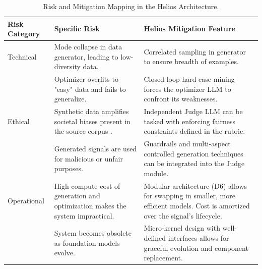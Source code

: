 \documentclass{article}
\begin{document}
\begin{table}[h]
  \centering
  \caption{Risk and Mitigation Mapping in the Helios Architecture.}
  \label{tab:risk_mitigation}
  \begin{tabular}{p{2.5cm}p{4.5cm}p{5cm}}
    \toprule
    \textbf{Risk Category} & \textbf{Specific Risk}                                                                                            & \textbf{Helios Mitigation Feature}                                                                                                                      \\
    \midrule
    Technical              & Mode collapse in data generator, leading to low-diversity data.                                                   & Correlated sampling in generator to ensure breadth of examples.                                                                                         \\
                           & Optimizer overfits to "easy" data and fails to generalize.                                                        & Closed-loop hard-case mining forces the optimizer LLM to confront its weaknesses.                                                                       \\
    \midrule
    Ethical                & Synthetic data amplifies societal biases present in the source corpus \citep{yu2023largelanguagemodelattributed}. & Independent Judge LLM can be tasked with enforcing fairness constraints defined in the rubric.                                                          \\
                           & Generated signals are used for malicious or unfair purposes.                                                      & Guardrails and multi-aspect controlled generation techniques \citep{zhang2024lightweightmultiaspectcontrolled} can be integrated into the Judge module. \\
    \midrule
    Operational            & High compute cost of generation and optimization makes the system impractical.                                    & Modular architecture (D6) allows for swapping in smaller, more efficient models. Cost is amortized over the signal's lifecycle.                         \\
                           & System becomes obsolete as foundation models evolve.                                                              & Micro-kernel design with well-defined interfaces allows for graceful evolution and component replacement.                                               \\
    \bottomrule
  \end{tabular}
\end{table}
\end{document}
